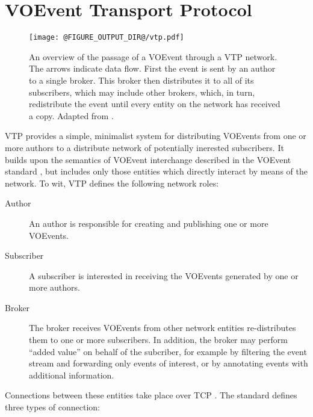 \documentclass[5p,authoryear]{elsarticle}
\begin{document}
\section{VOEvent Transport Protocol}
\label{sec:vtp}

\begin{figure*}
  \begin{center}
  \texttt{[image: @FIGURE\_OUTPUT\_DIR@/vtp.pdf]}
  \end{center}

  \caption{An overview of the passage of a VOEvent through a VTP network. The
  arrows indicate data flow. First the event is sent by an author to a single
  broker. This broker then distributes it to all of its subscribers, which may
  include other brokers, which, in turn, redistribute the event until every
  entity on the network has received a copy.  Adapted from
  \citet{Swinbank:2014}.}

  \label{fig:vtp}
\end{figure*}

VTP provides a simple, minimalist system for distributing VOEvents from one or
more authors to a distribute network of potentially inerested subscribers. It
builds upon the semantics of VOEvent interchange described in the VOEvent
standard \citep{Seaman:2011}, but includes only those entities which directly
interact by means of the network. To wit, VTP defines the following network
roles:

\begin{description}

  \item[Author]{An author is responsible for creating and publishing one or
  more VOEvents.}

  \item[Subscriber]{A subscriber is interested in receiving the VOEvents
  generated by one or more authors.}

  \item[Broker]{The broker receives VOEvents from other network entities
  re-distributes them to one or more subscribers. In addition, the broker may
  perform ``added value'' on behalf of the subcriber, for example by filtering
  the event stream and forwarding only events of interest, or by annotating
  events with additional information.}

\end{description}

Connections between these entities take place over TCP \citep{Cerf:1974}. The
standard defines three types of connection:
\end{document}
